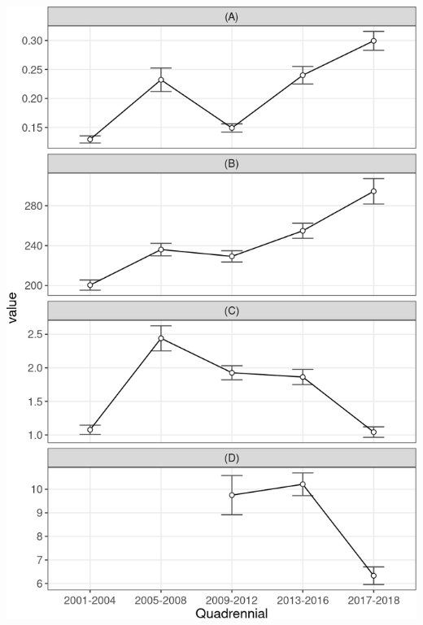 \documentclass[10pt,landscape,a3paper]{article}
\begin{document}
\begin{center}\includegraphics{img/modelling/aa-eda-ts-11} \end{center}
\end{document}
